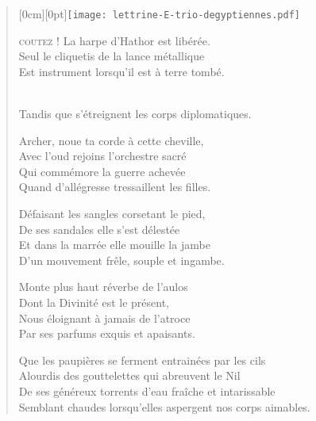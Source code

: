 \begin{verse}
\begin{minipage}{\linewidth}
\raisebox{-\height+0.7cm}[0cm][0pt]{\hspace{-1.1cm}\texttt{[image: lettrine-E-trio-degyptiennes.pdf]}}%
\textsc{coutez !}  La harpe d’Hathor est libérée.\\\nopagebreak[4]
\hspace{0.6cm}Seul le cliquetis de la lance métallique\\\nopagebreak[4]
\hspace{0.6cm}Est instrument lorsqu’il est à terre tombé.
\end{minipage}\\\vspace*{0.4ex}
Tandis que s’étreignent les corps diplomatiques.

Archer, noue ta corde à cette cheville,\\
Avec l’oud rejoins l’orchestre sacré\\
Qui commémore la guerre achevée\\
Quand d’allégresse tressaillent les filles.

Défaisant les sangles corsetant le pied,\\
De ses sandales elle s’est délestée\\
Et dans la marrée elle mouille la jambe\\
D’un mouvement frêle, souple et ingambe.

Monte plus haut réverbe de l’aulos\\
Dont la Divinité est le présent,\\
Nous éloignant à jamais de l’atroce\\
Par ses parfums exquis et apaisants.

Que les paupières se ferment entrainées par les cils\\
Alourdis des gouttelettes qui abreuvent le Nil\\
De ses généreux torrents d’eau fraîche et intarissable\\
Semblant chaudes lorsqu’elles aspergent nos corps aimables.
\end{verse}


%
